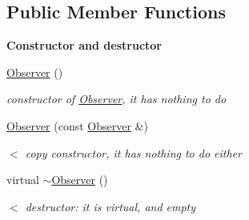 \subsection*{Public Member Functions}
\begin{Indent}\textbf{ Constructor and destructor}\par
\begin{DoxyCompactItemize}
\item 
\mbox{\label{class_s_m_spp__di__unipi__it_1_1_observer_abbd00a8000bd3ee5cd7e35aeb436f937}} 
\mbox{\hyperlink{class_s_m_spp__di__unipi__it_1_1_observer_abbd00a8000bd3ee5cd7e35aeb436f937}{Observer}} ()
\begin{DoxyCompactList}\small\item\em constructor of \mbox{\hyperlink{class_s_m_spp__di__unipi__it_1_1_observer}{Observer}}, it has nothing to do \end{DoxyCompactList}\item 
\mbox{\label{class_s_m_spp__di__unipi__it_1_1_observer_af6a9d3ca0b7f388f3b7ccb1eccf11f63}} 
\mbox{\hyperlink{class_s_m_spp__di__unipi__it_1_1_observer_af6a9d3ca0b7f388f3b7ccb1eccf11f63}{Observer}} (const \mbox{\hyperlink{class_s_m_spp__di__unipi__it_1_1_observer}{Observer}} \&)
\begin{DoxyCompactList}\small\item\em $<$ copy constructor, it has nothing to do either \end{DoxyCompactList}\item 
\mbox{\label{class_s_m_spp__di__unipi__it_1_1_observer_a12ef78f06414c4d4140c127e1c5b05c2}} 
virtual \mbox{\hyperlink{class_s_m_spp__di__unipi__it_1_1_observer_a12ef78f06414c4d4140c127e1c5b05c2}{$\sim$\+Observer}} ()
\begin{DoxyCompactList}\small\item\em $<$ destructor\+: it is virtual, and empty \end{DoxyCompactList}\end{DoxyCompactItemize}
\end{Indent}
